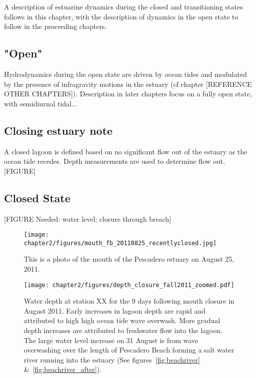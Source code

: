 A description of estuarine dynamics during the closed and transitioning
states follows in this chapter, with the description of dynamics in the
open state to follow in the proceeding chapters.

\subsection{"Open"} \label{opench2}
Hydrodynamics during the open state are driven by ocean tides and modulated by the presence of infragravity motions in the 
estuary (cf chapter [REFERENCE OTHER CHAPTERS]). Description in later chapters focus on a fully open state, with 
semidiurnal tidal...


\subsection{Closing estuary note} \label{closingest} A closed lagoon is
defined based on no significant flow out of the estuary as the ocean
tide recedes. Depth measurements are used to determine flow out.
[FIGURE]

\subsection{Closed State} \label{closed dynamics}


[FIGURE Needed: water level: closure through breach]

\begin{figure}
\texttt{[image: chapter2/figures/mouth\_fb\_20110825\_recentlyclosed.jpg]} \caption{This is a photo of the
mouth of the Pescadero estuary on August 25, 2011.}
\label{fig:mouth_fb_20110825} \end{figure}

\begin{figure}
\texttt{[image: chapter2/figures/depth\_closure\_fall2011\_zoomed.pdf]} \caption{Water depth at station XX for the 9 days following mouth closure in August 2011. Early increases in lagoon depth are rapid and attributed to high high ocean tide wave overwash. More gradual depth increases are attributed to freshwater flow into the lagoon. The large water level increase on 31 August is from wave overwashing over the length of Pescadero Beach forming a salt water river running into the estuary (See figures~\ref{fig:beachriver} \&~\ref{fig:beachriver_after}).}
\label{fig:depthclosuref11} \end{figure}


